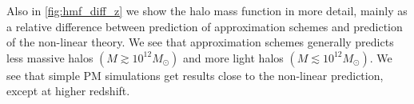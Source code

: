 Also in \autoref{fig:hmf_diff_z} we show the halo mass function in more detail, mainly as a relative difference between prediction of approximation schemes and prediction of the non-linear theory. We see that approximation schemes generally predicts less massive halos $(M\gtrsim10^{12}M_\odot)$ and more light halos $(M\lesssim10^{12}M_\odot)$. We see that simple PM simulations get results close to the non-linear prediction, except at higher redshift.